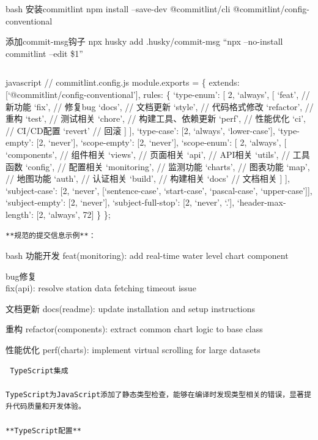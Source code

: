 {{bash  安装commitlint npm install --save-dev @commitlint/cli @commitlint/config-conventional

 添加commit-msg钩子 npx husky add .husky/commit-msg ``npx --no-install commitlint --edit \$1''

\begin{lstlisting}

\end{lstlisting}

javascript // commitlint.config.js module.exports = \{ extends: {[}`@commitlint/config-conventional'{]}, rules: \{ `type-enum': {[} 2, `always', {[} `feat', // 新功能 `fix', // 修复bug `docs', // 文档更新 `style', // 代码格式修改 `refactor', // 重构 `test', // 测试相关 `chore', // 构建工具、依赖更新 `perf', // 性能优化 `ci', // CI/CD配置 `revert' // 回滚 {]} {]}, `type-case': {[}2, `always', `lower-case'{]}, `type-empty': {[}2, `never'{]}, `scope-empty': {[}2, `never'{]}, `scope-enum': {[} 2, `always', {[} `components', // 组件相关 `views', // 页面相关 `api', // API相关 `utils', // 工具函数 `config', // 配置相关 `monitoring', // 监测功能 `charts', // 图表功能 `map', // 地图功能 `auth', // 认证相关 `build', // 构建相关 `docs' // 文档相关 {]} {]}, `subject-case': {[}2, `never', {[}`sentence-case', `start-case', `pascal-case', `upper-case'{]}{]}, `subject-empty': {[}2, `never'{]}, `subject-full-stop': {[}2, `never', `.'{]}, `header-max-length': {[}2, `always', 72{]} \} \};

\begin{lstlisting}
**规范的提交信息示例**：
\end{lstlisting}

bash  功能开发 feat(monitoring): add real-time water level chart component

 bug修复\\
fix(api): resolve station data fetching timeout issue

 文档更新 docs(readme): update installation and setup instructions

 重构 refactor(components): extract common chart logic to base class

 性能优化 perf(charts): implement virtual scrolling for large datasets

\begin{lstlisting}
 TypeScript集成

TypeScript为JavaScript添加了静态类型检查，能够在编译时发现类型相关的错误，显著提升代码质量和开发体验。

**TypeScript配置**
\end{lstlisting}

}}

